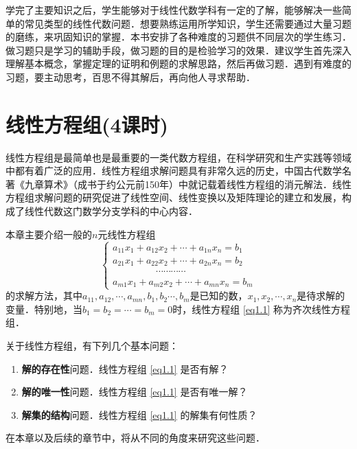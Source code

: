 \documentclass[a4paper,fontset=windows]{ctexbook}
\theoremstyle{definition}
\begin{document}
学完了主要知识之后，学生能够对于线性代数学科有一定的了解，能够解决一些简单的常见类型的线性代数问题．想要熟练运用所学知识，学生还需要通过大量习题的磨练，来巩固知识的掌握．本书安排了各种难度的习题供不同层次的学生练习．做习题只是学习的辅助手段，做习题的目的是检验学习的效果．建议学生首先深入理解基本概念，掌握定理的证明和例题的求解思路，然后再做习题．遇到有难度的习题，要主动思考，百思不得其解后，再向他人寻求帮助．

\tableofcontents

\clearpage{}%

\chapter{线性方程组(4课时)}%

线性方程组是最简单也是最重要的一类代数方程组，在科学研究和生产实践等领域中都有着广泛的应用．线性方程组求解问题具有非常久远的历史，中国古代数学名著《九章算术》（成书于约公元前150年）中就记载着线性方程组的消元解法．线性方程组求解问题的研究促进了线性空间、线性变换以及矩阵理论的建立和发展，构成了线性代数这门数学分支学科的中心内容．

本章主要介绍一般的$n$元线性方程组
\begin{equation}\label{eq1.1}
\begin{cases}
a_{11}x_1+a_{12}x_2+\cdots+a_{1n}x_n=b_1 \\
a_{21}x_1+a_{22}x_2+\cdots+a_{2n}x_n=b_2 \\
\hspace{54pt}\cdots\cdots\cdots\cdots \\
a_{m1}x_1+a_{m2}x_2+\cdots+a_{mn}x_n=b_m
\end{cases}
\end{equation}
的求解方法，其中$a_{11},a_{12},\cdots,a_{mn},b_1,b_2\cdots,b_m$是已知的数，$x_1,x_2,\cdots,x_n$是待求解的变量．特别地，当$b_1=b_2=\cdots=b_m=0$时，线性方程组 \eqref{eq1.1} 称为齐次线性方程组．

关于线性方程组，有下列几个基本问题：
\begin{enumerate}
\item {\bf 解的存在性}问题．线性方程组 \eqref{eq1.1} 是否有解？
\item {\bf 解的唯一性}问题．线性方程组 \eqref{eq1.1} 是否有唯一解？
\item {\bf 解集的结构}问题．线性方程组 \eqref{eq1.1} 的解集有何性质？
\end{enumerate}
在本章以及后续的章节中，将从不同的角度来研究这些问题．
\end{document}
